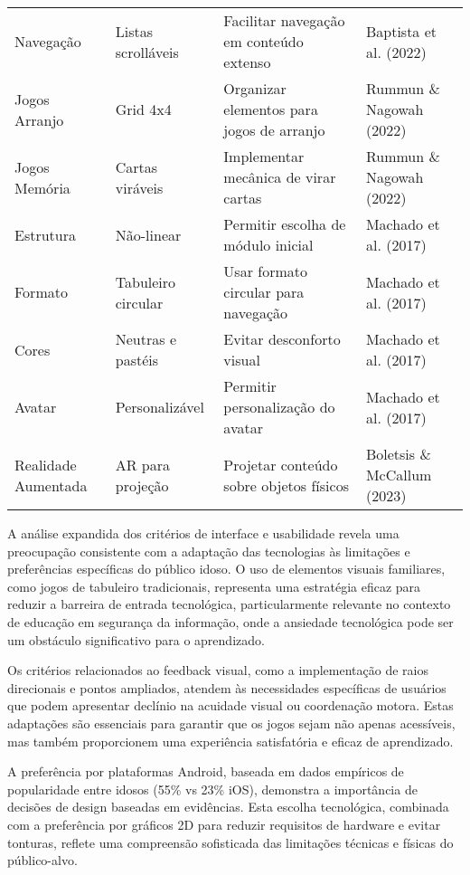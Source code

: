 \begin{table}[H]
\begin{tabular}{p{2.5cm}p{3.5cm}p{4.5cm}p{2.5cm}}
Navegação & Listas scrolláveis & Facilitar navegação em conteúdo extenso & Baptista et al. (2022) \\
Jogos Arranjo & Grid 4x4 & Organizar elementos para jogos de arranjo & Rummun \& Nagowah (2022) \\
Jogos Memória & Cartas viráveis & Implementar mecânica de virar cartas & Rummun \& Nagowah (2022) \\
Estrutura & Não-linear & Permitir escolha de módulo inicial & Machado et al. (2017) \\
Formato & Tabuleiro circular & Usar formato circular para navegação & Machado et al. (2017) \\
Cores & Neutras e pastéis & Evitar desconforto visual & Machado et al. (2017) \\
Avatar & Personalizável & Permitir personalização do avatar & Machado et al. (2017) \\
Realidade Aumentada & AR para projeção & Projetar conteúdo sobre objetos físicos & Boletsis \& McCallum (2023) \\
\hline
\end{tabular}
\end{table}

A análise expandida dos critérios de interface e usabilidade revela uma preocupação consistente com a adaptação das tecnologias às limitações e preferências específicas do público idoso. O uso de elementos visuais familiares, como jogos de tabuleiro tradicionais, representa uma estratégia eficaz para reduzir a barreira de entrada tecnológica, particularmente relevante no contexto de educação em segurança da informação, onde a ansiedade tecnológica pode ser um obstáculo significativo para o aprendizado.

Os critérios relacionados ao feedback visual, como a implementação de raios direcionais e pontos ampliados, atendem às necessidades específicas de usuários que podem apresentar declínio na acuidade visual ou coordenação motora. Estas adaptações são essenciais para garantir que os jogos sejam não apenas acessíveis, mas também proporcionem uma experiência satisfatória e eficaz de aprendizado.

A preferência por plataformas Android, baseada em dados empíricos de popularidade entre idosos (55\% vs 23\% iOS), demonstra a importância de decisões de design baseadas em evidências. Esta escolha tecnológica, combinada com a preferência por gráficos 2D para reduzir requisitos de hardware e evitar tonturas, reflete uma compreensão sofisticada das limitações técnicas e físicas do público-alvo.

